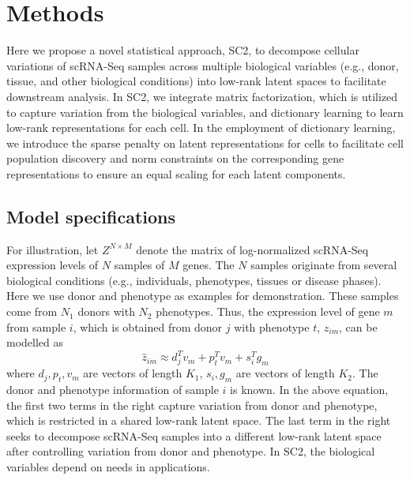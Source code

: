 \documentclass[12pt]{article}
\begin{document}
\section{Methods}
  Here we propose a novel statistical approach, SC2, to decompose cellular variations of scRNA-Seq samples across multiple biological variables (e.g., donor, tissue, and other biological conditions) into low-rank latent spaces to facilitate downstream analysis. In SC2, we integrate matrix factorization, which is utilized to capture variation from the biological variables, and dictionary learning to learn low-rank representations for each cell. In the employment of dictionary learning, we introduce the sparse penalty on latent representations for cells to facilitate cell population discovery and norm constraints on the corresponding gene representations to ensure an equal scaling for each latent components.

  \subsection{Model specifications}
    For illustration, let $Z^{N \times M}$ denote the matrix of log-normalized scRNA-Seq expression levels of $N$ samples of $M$ genes. The $N$ samples originate from several biological conditions (e.g., individuals, phenotypes, tissues or disease phases). Here we use donor and phenotype as examples for demonstration. These samples come from $N_1$ donors with $N_2$ phenotypes. Thus, the expression level of gene $m$ from sample $i$, which is obtained from donor $j$ with phenotype $t$, $z_{im}$, can be modelled as
    \begin{equation}
      \label{eqn::sc_rna_eqn}
        \hat{z}_{im} \approx d_{j}^T v_m + p_{t}^T v_m + s_i^T g_m
    \end{equation}
    where $d_j, p_t, v_m$ are vectors of length $K_1$, $s_i, g_m$ are vectors of length $K_2$. The donor and phenotype information of sample $i$ is known. In the above equation, the first two terms in the right capture variation from donor and phenotype, which is restricted in a shared low-rank latent space. The last term in the right seeks to decompose scRNA-Seq samples into a different low-rank latent space after controlling  variation from donor and phenotype. In SC2, the biological variables depend on needs in applications. 
\end{document}
